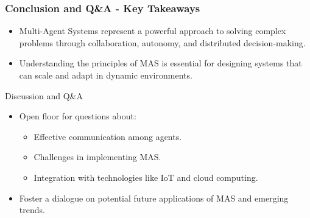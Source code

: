 \documentclass[aspectratio=169]{beamer}
\begin{document}
\begin{frame}[fragile]
    \frametitle{Conclusion and Q\&A - Key Takeaways}
    
    \begin{itemize}
        \item Multi-Agent Systems represent a powerful approach to solving complex problems through collaboration, autonomy, and distributed decision-making.
        \item Understanding the principles of MAS is essential for designing systems that can scale and adapt in dynamic environments.
    \end{itemize}

    \begin{block}{Discussion and Q\&A}
        \begin{itemize}
            \item Open floor for questions about:
            \begin{itemize}
                \item Effective communication among agents.
                \item Challenges in implementing MAS.
                \item Integration with technologies like IoT and cloud computing.
            \end{itemize}
            \item Foster a dialogue on potential future applications of MAS and emerging trends.
        \end{itemize}
    \end{block}
\end{frame}
\end{document}
